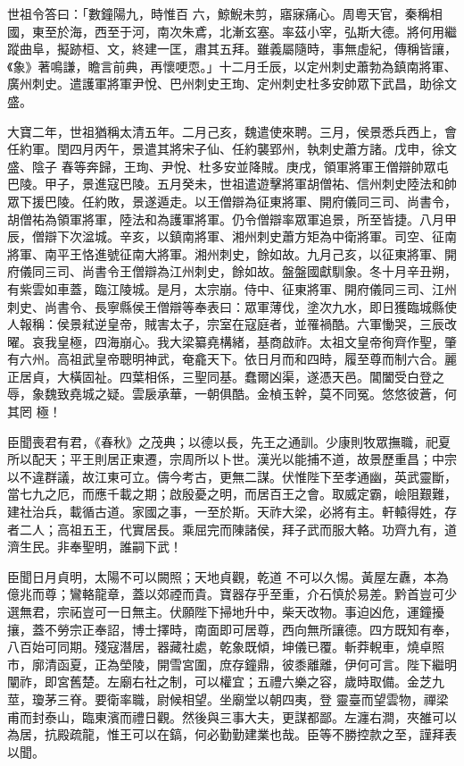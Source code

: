 \begin{pinyinscope}
 世祖令答曰：「數鐘陽九，時惟百
 六，鯨鯢未剪，寤寐痛心。周粵天官，秦稱相國，東至於海，西至于河，南次朱鳶，北漸玄塞。率茲小宰，弘斯大德。將何用繼蹤曲阜，擬跡桓、文，終建一匡，肅其五拜。雖義屬隨時，事無虛紀，傳稱皆讓，《象》著鳴謙，瞻言前典，再懷哽恧。」十二月壬辰，以定州刺史蕭勃為鎮南將軍、廣州刺史。遣護軍將軍尹悅、巴州刺史王珣、定州刺史杜多安帥眾下武昌，助徐文盛。



 大寶二年，世祖猶稱太清五年。二月己亥，魏遣使來聘。三月，侯景悉兵西上，會任約軍。閏四月丙午，景遣其將宋子仙、任約襲郢州，執刺史蕭方諸。戊申，徐文盛、陰子
 春等奔歸，王珣、尹悅、杜多安並降賊。庚戌，領軍將軍王僧辯帥眾屯巴陵。甲子，景進寇巴陵。五月癸未，世祖遣遊擊將軍胡僧祐、信州刺史陸法和帥眾下援巴陵。任約敗，景遂遁走。以王僧辯為征東將軍、開府儀同三司、尚書令，胡僧祐為領軍將軍，陸法和為護軍將軍。仍令僧辯率眾軍追景，所至皆捷。八月甲辰，僧辯下次湓城。辛亥，以鎮南將軍、湘州刺史蕭方矩為中衛將軍。司空、征南將軍、南平王恪進號征南大將軍。湘州刺史，餘如故。九月己亥，以征東將軍、開府儀同三司、尚書令王僧辯為江州刺史，餘如故。盤盤國獻馴象。冬十月辛丑朔，
 有紫雲如車蓋，臨江陵城。是月，太宗崩。侍中、征東將軍、開府儀同三司、江州刺史、尚書令、長寧縣侯王僧辯等奉表曰：眾軍薄伐，塗次九水，即日獲臨城縣使人報稱：侯景弒逆皇帝，賊害太子，宗室在寇庭者，並罹禍酷。六軍慟哭，三辰改曜。哀我皇極，四海崩心。我大梁纂堯構緒，基商啟祚。太祖文皇帝徇齊作聖，肇有六州。高祖武皇帝聰明神武，奄龕天下。依日月而和四時，履至尊而制六合。麗正居貞，大橫固祉。四葉相係，三聖同基。蠢爾凶渠，遂憑天邑。閶闔受白登之辱，象魏致堯城之疑。雲扆承華，一朝俱酷。金楨玉幹，莫不同冤。悠悠彼蒼，何其罔
 極！



 臣聞喪君有君，《春秋》之茂典；以德以長，先王之通訓。少康則牧眾撫職，祀夏所以配天；平王則居正東遷，宗周所以卜世。漢光以能捕不道，故景歷重昌；中宗以不違群議，故江東可立。儔今考古，更無二謀。伏惟陛下至孝通幽，英武靈斷，當七九之厄，而應千載之期；啟殷憂之明，而居百王之會。取威定霸，嶮阻艱難，建社治兵，載循古道。家國之事，一至於斯。天祚大梁，必將有主。軒轅得姓，存者二人；高祖五王，代實居長。乘屈完而陳諸侯，拜子武而服大輅。功齊九有，道濟生民。非奉聖明，誰嗣下武！



 臣聞日月貞明，太陽不可以闕照；天地貞觀，乾道
 不可以久惕。黃屋左纛，本為億兆而尊；鸞輅龍章，蓋以郊禋而貴。寶器存乎至重，介石慎於易差。黔首豈可少選無君，宗祏豈可一日無主。伏願陛下掃地升中，柴天改物。事迫凶危，運鐘擾攘，蓋不勞宗正奉詔，博士擇時，南面即可居尊，西向無所讓德。四方既知有奉，八百始可同期。殘寇潛居，器藏社處，乾象既傾，坤儀已覆。斬莽輗車，燒卓照市，廓清函夏，正為塋陵，開雪宮圍，庶存鐘鼎，彼黍離離，伊何可言。陛下繼明闡祚，即宮舊楚。左廟右社之制，可以權宜；五禮六樂之容，歲時取備。金芝九莖，瓊茅三脊。要衛率職，尉候相望。坐廟堂以朝四夷，登
 靈臺而望雲物，禪梁甫而封泰山，臨東濱而禮日觀。然後與三事大夫，更謀都鄙。左瀍右澗，夾雒可以為居，抗殿疏龍，惟王可以在鎬，何必勤勤建業也哉。臣等不勝控款之至，謹拜表以聞。




\end{pinyinscope}
